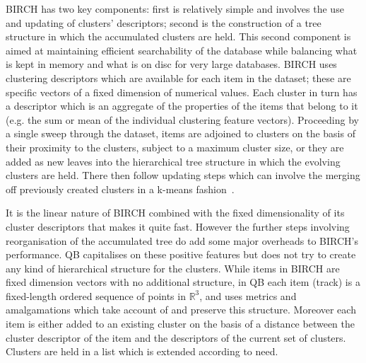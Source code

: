 \documentclass[preprint,authoryear,a4paper,10pt,onecolumn]{elsarticle}
\begin{document}
BIRCH has two key components: first is relatively simple and involves
the use and updating of clusters' descriptors; second is the
construction of a tree structure in which the accumulated clusters are
held. This second component is aimed at maintaining efficient
searchability of the database while balancing what is kept in memory and
what is on disc for very large databases. BIRCH uses clustering
descriptors which are available for each item in the dataset; these are
specific vectors of a fixed dimension of numerical values. Each cluster
in turn has a descriptor which is an aggregate of the properties of the
items that belong to it (e.g. the sum or mean of the individual
clustering feature vectors). Proceeding by a single sweep through the
dataset, items are adjoined to clusters on the basis of their proximity
to the clusters, subject to a maximum cluster size, or they are added as
new leaves into the hierarchical tree structure in which the evolving
clusters are held. There then follow updating steps which can involve
the merging off previously created clusters in a k-means
fashion~\citep{steinhaus1956division,macqueen1967some}.

It is the linear nature of BIRCH combined with the fixed dimensionality
of its cluster descriptors that makes it quite fast. However the further
steps involving reorganisation of the accumulated tree do add some major
overheads to BIRCH's performance. QB capitalises on these positive
features but does not try to create any kind of hierarchical structure
for the clusters. While items in BIRCH are fixed dimension vectors with
no additional structure, in QB each item (track) is a fixed-length
ordered sequence of points in $\mathbb{R}^{3}$, and uses metrics and
amalgamations which take account of and preserve this structure.
Moreover each item is either added to an existing cluster on the basis
of a distance between the cluster descriptor of the item and the
descriptors of the current set of clusters. Clusters are held in a list
which is extended according to need.
\end{document}
